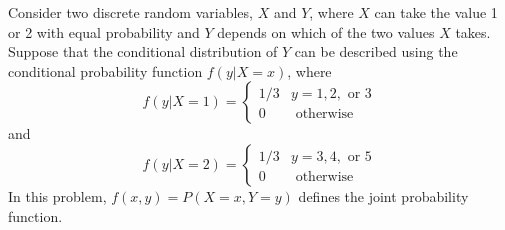 \documentclass[addpoints]{examsetup}\usepackage[]{graphicx}\usepackage[]{color}
\begin{document}
\begin{questions}

\newpage

\question

Consider two discrete random variables, $X$ and $Y$, where $X$ can take the value 1 or 2 with equal probability and $Y$ depends on which of the two values $X$ takes.
Suppose that the conditional distribution of $Y$ can be described using the conditional probability function $f(y|X=x)$, where
$$
f(y|X = 1) = 
\begin{cases}
   1/3 & y = 1, 2, \text{ or } 3 \\
   0 &  \text{ otherwise }
\end{cases}
$$
and
$$
f(y|X = 2) = 
\begin{cases}
   1/3 & y = 3, 4, \text{ or } 5 \\
   0 &  \text{ otherwise }
\end{cases}
$$
In this problem, $f(x,y) = P(X = x, Y = y)$ defines the joint probability function.


\end{questions}
\end{document}
